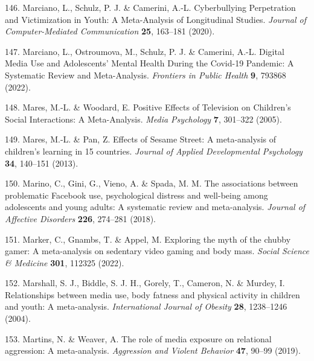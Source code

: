 \documentclass[
  english,
  man]{apa6}
\newenvironment{cslreferences}%
  {}%
  {\par}
\begin{document}
\begin{cslreferences}
\leavevmode\hypertarget{ref-marcianoCyberbullyingPerpetrationVictimization2020}{}%
146. Marciano, L., Schulz, P. J. \& Camerini, A.-L. Cyberbullying Perpetration and Victimization in Youth: A Meta-Analysis of Longitudinal Studies. \emph{Journal of Computer-Mediated Communication} \textbf{25}, 163--181 (2020).

\leavevmode\hypertarget{ref-marcianoDigitalMediaUse2021}{}%
147. Marciano, L., Ostroumova, M., Schulz, P. J. \& Camerini, A.-L. Digital Media Use and Adolescents' Mental Health During the Covid-19 Pandemic: A Systematic Review and Meta-Analysis. \emph{Frontiers in Public Health} \textbf{9}, 793868 (2022).

\leavevmode\hypertarget{ref-maresPositiveEffectsTelevision2005}{}%
148. Mares, M.-L. \& Woodard, E. Positive Effects of Television on Children's Social Interactions: A Meta-Analysis. \emph{Media Psychology} \textbf{7}, 301--322 (2005).

\leavevmode\hypertarget{ref-maresEffectsSesameStreet2013}{}%
149. Mares, M.-L. \& Pan, Z. Effects of Sesame Street: A meta-analysis of children's learning in 15 countries. \emph{Journal of Applied Developmental Psychology} \textbf{34}, 140--151 (2013).

\leavevmode\hypertarget{ref-marinoAssociationsProblematicFacebook2018}{}%
150. Marino, C., Gini, G., Vieno, A. \& Spada, M. M. The associations between problematic Facebook use, psychological distress and well-being among adolescents and young adults: A systematic review and meta-analysis. \emph{Journal of Affective Disorders} \textbf{226}, 274--281 (2018).

\leavevmode\hypertarget{ref-markerExploringMythChubby2022}{}%
151. Marker, C., Gnambs, T. \& Appel, M. Exploring the myth of the chubby gamer: A meta-analysis on sedentary video gaming and body mass. \emph{Social Science \& Medicine} \textbf{301}, 112325 (2022).

\leavevmode\hypertarget{ref-marshallRelationshipsMediaUse2004}{}%
152. Marshall, S. J., Biddle, S. J. H., Gorely, T., Cameron, N. \& Murdey, I. Relationships between media use, body fatness and physical activity in children and youth: A meta-analysis. \emph{International Journal of Obesity} \textbf{28}, 1238--1246 (2004).

\leavevmode\hypertarget{ref-martinsRoleMediaExposure2019}{}%
153. Martins, N. \& Weaver, A. The role of media exposure on relational aggression: A meta-analysis. \emph{Aggression and Violent Behavior} \textbf{47}, 90--99 (2019).


\end{cslreferences}
\end{document}
